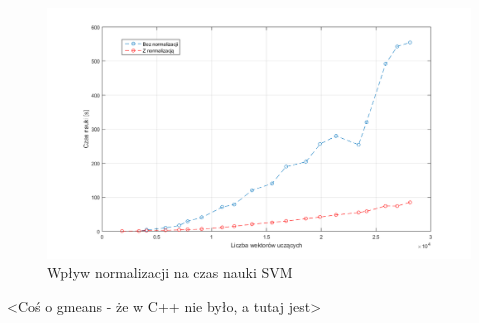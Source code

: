 \begin{figure}[!htp]
	\centering
	\includegraphics[width=15cm]{Grafika/SVMTrain}
	\caption{Wpływ normalizacji na czas nauki SVM}
	\label{fig:TrainNormSVM}
\end{figure}

<Coś o gmeans - że w C++ nie było, a tutaj jest>


